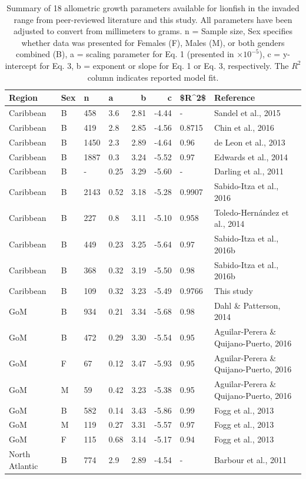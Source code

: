 \documentclass[]{article}
\theoremstyle{definition}
\theoremstyle{definition}
\theoremstyle{definition}
\theoremstyle{remark}
\begin{document}
\begin{table}

\caption{\label{tab:unnamed-chunk-11}\label{tab:all_params}Summary of 18 allometric growth parameters available for lionfish in the invaded range from peer-reviewed literature and this study. All parameters have been adjusted to convert from millimeters to grams. n = Sample size, Sex specifies whether data was presented for Females (F), Males (M), or both genders combined (B), a = scaling parameter for Eq. 1 (presented in $\times 10^{-5}$), c = y-intercept for Eq. 3, b = exponent or slope for Eq. 1 or Eq. 3, respectively. The $R^2$ column indicates reported model fit.}
\centering
\begin{tabular}[t]{llllrrll}
\toprule
Region & Sex & n & a & b & c & \$R\textasciicircum{}2\$ & Reference\\
\midrule
Caribbean & B & 458 & 3.6 & 2.81 & -4.44 & - & Sandel et al., 2015\\
Caribbean & B & 419 & 2.8 & 2.85 & -4.56 & 0.8715 & Chin et al., 2016\\
Caribbean & B & 1450 & 2.3 & 2.89 & -4.64 & 0.96 & de Leon et al., 2013\\
Caribbean & B & 1887 & 0.3 & 3.24 & -5.52 & 0.97 & Edwards et al., 2014\\
Caribbean & B & - & 0.25 & 3.29 & -5.60 & - & Darling et al., 2011\\
\addlinespace
Caribbean & B & 2143 & 0.52 & 3.18 & -5.28 & 0.9907 & Sabido-Itza et al., 2016\\
Caribbean & B & 227 & 0.8 & 3.11 & -5.10 & 0.958 & Toledo-Hernández et al., 2014\\
Caribbean & B & 449 & 0.23 & 3.25 & -5.64 & 0.97 & Sabido-Itza et al., 2016b\\
Caribbean & B & 368 & 0.32 & 3.19 & -5.50 & 0.98 & Sabido-Itza et al., 2016b\\
Caribbean & B & 109 & 0.32 & 3.23 & -5.49 & 0.9766 & This study\\
\addlinespace
GoM & B & 934 & 0.21 & 3.34 & -5.68 & 0.98 & Dahl \& Patterson, 2014\\
GoM & B & 472 & 0.29 & 3.30 & -5.54 & 0.95 & Aguilar-Perera \& Quijano-Puerto, 2016\\
GoM & F & 67 & 0.12 & 3.47 & -5.93 & 0.95 & Aguilar-Perera \& Quijano-Puerto, 2016\\
GoM & M & 59 & 0.42 & 3.23 & -5.38 & 0.95 & Aguilar-Perera \& Quijano-Puerto, 2016\\
GoM & B & 582 & 0.14 & 3.43 & -5.86 & 0.99 & Fogg et al., 2013\\
\addlinespace
GoM & M & 119 & 0.27 & 3.31 & -5.57 & 0.97 & Fogg et al., 2013\\
GoM & F & 115 & 0.68 & 3.14 & -5.17 & 0.94 & Fogg et al., 2013\\
North Atlantic & B & 774 & 2.9 & 2.89 & -4.54 & - & Barbour et al., 2011\\
\bottomrule
\end{tabular}
\end{table}
\end{document}
